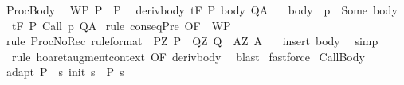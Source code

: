 \begin{isabellebody}
\isamarkupfalse%
%
\endisatagproof
{\isafoldproof}%
%
\isadelimproof
\isanewline
%
\endisadelimproof
\isanewline
{}\isamarkupfalse%
\ ProcBody{\isacharcolon}\isanewline
\ \ WP{\isacharcolon}\ {\isachardoublequoteopen}P\ {\isasymsubseteq}\ P{\isacharprime}{\isachardoublequoteclose}\isanewline
\ \ deriv{\isacharunderscore}body{\isacharcolon}\ {\isachardoublequoteopen}{\isasymGamma}{\isacharcomma}{\isasymTheta}{\isasymturnstile}\isactrlsub t\isactrlbsub {\isacharslash}F\isactrlesub \ P{\isacharprime}\ body\ Q{\isacharcomma}A{\isachardoublequoteclose}\ \isanewline
\ \ body{\isacharcolon}\ {\isachardoublequoteopen}{\isasymGamma}\ p\ {\isacharequal}\ Some\ body{\isachardoublequoteclose}\isanewline
\ \ {\isachardoublequoteopen}{\isasymGamma}{\isacharcomma}{\isasymTheta}{\isasymturnstile}\isactrlsub t\isactrlbsub {\isacharslash}F\isactrlesub \ P\ Call\ p\ Q{\isacharcomma}A{\isachardoublequoteclose}\isanewline
%
\isadelimproof
%
\endisadelimproof
%
\isatagproof
{}\isamarkupfalse%
\ {\isacharparenleft}rule\ conseqPre\ {\isacharbrackleft}OF\ {\isacharunderscore}\ WP{\isacharbrackright}{\isacharparenright}\isanewline
{}\isamarkupfalse%
\ {\isacharparenleft}rule\ ProcNoRec{}\ {\isacharbrackleft}rule{\isacharunderscore}format{\isacharcomma}\ \ P{\isacharequal}{\isachardoublequoteopen}{\isasymlambda}Z{\isachardot}\ P{\isacharprime}{\isachardoublequoteclose}\ \ Q{\isacharequal}{\isachardoublequoteopen}{\isasymlambda}Z{\isachardot}\ Q{\isachardoublequoteclose}\ \ A{\isacharequal}{\isachardoublequoteopen}{\isasymlambda}Z{\isachardot}\ A{\isachardoublequoteclose}{\isacharbrackright}{\isacharparenright}\ \isanewline
{}\isamarkupfalse%
\ \ {\isacharparenleft}insert\ body{\isacharparenright}\isanewline
{}\isamarkupfalse%
\ \ simp\isanewline
{}\isamarkupfalse%
\ \ {\isacharparenleft}rule\ hoaret{\isacharunderscore}augment{\isacharunderscore}context\ {\isacharbrackleft}OF\ deriv{\isacharunderscore}body{\isacharbrackright}{\isacharparenright}\isanewline
{}\isamarkupfalse%
\ \ blast\isanewline
{}\isamarkupfalse%
\ fastforce\isanewline
{}\isamarkupfalse%
%
\endisatagproof
{\isafoldproof}%
%
\isadelimproof
\isanewline
%
\endisadelimproof
\isanewline
{}\isamarkupfalse%
\ CallBody{\isacharcolon}\isanewline
{}\ adapt{\isacharcolon}\ {\isachardoublequoteopen}P\ {\isasymsubseteq}\ {\isacharbraceleft}s{\isachardot}\ init\ s\ {\isasymin}\ P{\isacharprime}\ s{\isacharbraceright}{\isachardoublequoteclose}\isanewline

\end{isabellebody}
